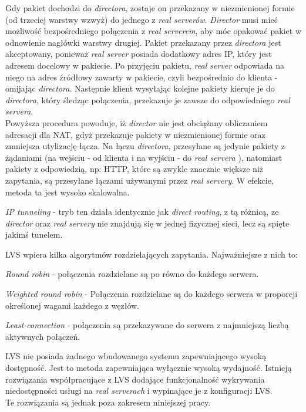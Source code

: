 {\begin{description}
Gdy pakiet dochodzi do \textit{directora}, zostaje on przekazany w niezmienionej formie (od trzeciej warstwy wzwyż) do jednego z \textit{real serverów}. \textit{Director} musi mieć możliwość bezpośredniego połączenia z \textit{real serverem}, aby móc opakować pakiet w odnowienie nagłówki warstwy drugiej.
		Pakiet przekazany przez \textit{directora} jest akceptowany, ponieważ \textit{real server} posiada dodatkowy adres IP, który jest adresem docelowy w pakiecie.
		Po przyjęciu pakietu, \textit{real server} odpowiada na niego na adres źródłowy zawarty w pakiecie, czyli bezpośrednio do klienta - omijając \textit{directora}.
		Następnie klient wysyłając kolejne pakiety kieruje je do \textit{directora}, który śledząc połączenia, przekazuje je zawsze do odpowiedniego \textit{real servera}.\\
Powyższa procedura powoduje, iż \textit{director} nie jest obciążany obliczaniem adresacji dla NAT, gdyż przekazuje pakiety w niezmienionej formie oraz zmniejsza utylizację łącza. Na łączu \textit{directora}, przesyłane są jedynie pakiety z żądaniami (na wejściu - od klienta i na wyjściu - do \textit{real servera	}), natomiast pakiety z odpowiedzią, np: HTTP, które są zwykle znacznie większe niż zapytania, są przesyłane łączami używanymi przez \textit{real servery}.
		W efekcie, metoda ta jest wysoko skalowalna.
	\item{\textit{IP tunneling}} - tryb ten działa identycznie jak \textit{direct routing}, z tą różnicą, ze \textit{director} oraz \textit{real servery} nie znajdują się w jednej fizycznej sieci, lecz są spięte jakimś tunelem.
\end{description}
LVS wpiera kilka algorytmów rozdzielających zapytania. Najważniejsze z nich to:
\begin{description}
	\item{\textit{Round robin}} - połączenia rozdzielane są po równo do każdego serwera.
	\item{\textit{Weighted round robin}} - Połączenia rozdzielane są do każdego serwera w proporcji określonej wagami każdego z węzłów.
	\item{\textit{Least-connection}} - połączenia są przekazywane do serwera z najmniejszą liczbą aktywnych połączeń.
\end{description}

LVS nie posiada żadnego wbudowanego systemu zapewniającego wysoką dostępność.
Jest to metoda zapewniająca wyłącznie wysoką wydajność.
Istnieją rozwiązania współpracujące z LVS dodające funkcjonalność wykrywania niedostępności usługi na \textit{real serverach} i wypinające je z konfiguracji LVS.\\
Te rozwiązania są jednak poza zakresem niniejszej pracy.
}
